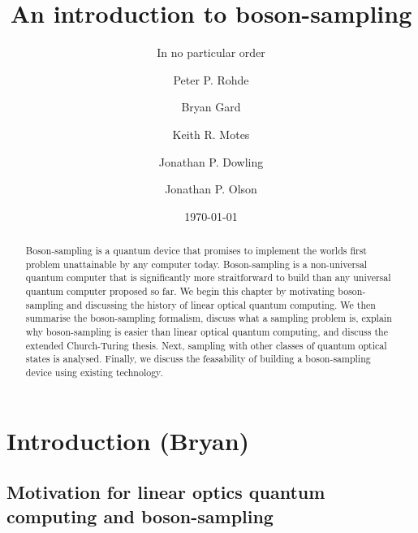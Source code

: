 \documentclass[aps,pra,twocolumn,amsmath,amssymb,nofootinbib,superscriptaddress]{revtex4}
\begin{document}


%
% 

\title{An introduction to boson-sampling}

%
%

\author{In no particular order}

\author{Peter P. Rohde}

\author{Bryan Gard}

\author{Keith R. Motes}

\author{Jonathan P. Dowling}

\author{Jonathan P. Olson}

\date{\today}

\frenchspacing

%
%

\begin{abstract}
Boson-sampling is a quantum device that promises to implement the worlds first problem unattainable by any computer today. Boson-sampling is a non-universal quantum computer that is significantly more straitforward to build than any universal quantum computer proposed so far. We begin this chapter by motivating boson-sampling and discussing the history of linear optical quantum computing. We then summarise the boson-sampling formalism, discuss what a sampling problem is, explain why boson-sampling is easier than linear optical quantum computing, and discuss the extended Church-Turing thesis. Next, sampling with other classes of quantum optical states is analysed. Finally, we discuss the feasability of building a boson-sampling device using existing technology. 
\end{abstract}

\maketitle

\section{Introduction (Bryan)}

\subsection{Motivation for linear optics quantum computing and boson-sampling}
\end{document}
